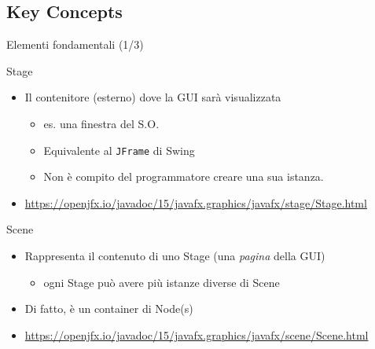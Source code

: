 \documentclass[presentation]{beamer}
\begin{document}

\subsection{Key Concepts}

\begin{frame}{Elementi fondamentali (1/3)}
\begin{block}{Stage}
\begin{itemize}
\item Il contenitore (esterno) dove la GUI sarà visualizzata
\begin{itemize}
\item es. una finestra del S.O.
\item Equivalente al \texttt{JFrame} di Swing
\item Non è compito del programmatore creare una sua istanza.
\end{itemize}
\item \url{https://openjfx.io/javadoc/15/javafx.graphics/javafx/stage/Stage.html}
\end{itemize}
\end{block}

\begin{block}{Scene}
\begin{itemize}
\item Rappresenta il contenuto di uno Stage (una \emph{pagina} della GUI)
\begin{itemize}
\item ogni Stage può avere più istanze diverse di Scene
\end{itemize}
\item Di fatto, è un container di Node(s)
\item \url{https://openjfx.io/javadoc/15/javafx.graphics/javafx/scene/Scene.html}
\end{itemize}
\end{block}
\end{frame}
\end{document}
